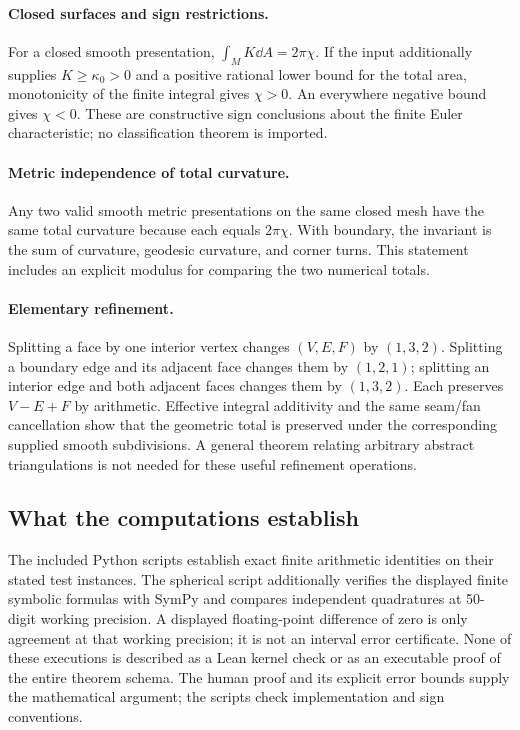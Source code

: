 \paragraph{Closed surfaces and sign restrictions.}
For a closed smooth presentation, $\int_MK\dd A=2\pi\chi$. If the input additionally supplies $K\ge\kappa_0>0$ and a positive rational lower bound for the total area, monotonicity of the finite integral gives $\chi>0$. An everywhere negative bound gives $\chi<0$. These are constructive sign conclusions about the finite Euler characteristic; no classification theorem is imported.

\paragraph{Metric independence of total curvature.}
Any two valid smooth metric presentations on the same closed mesh have the same total curvature because each equals $2\pi\chi$. With boundary, the invariant is the sum of curvature, geodesic curvature, and corner turns. This statement includes an explicit modulus for comparing the two numerical totals.

\paragraph{Elementary refinement.}
Splitting a face by one interior vertex changes $(V,E,F)$ by $(1,3,2)$. Splitting a boundary edge and its adjacent face changes them by $(1,2,1)$; splitting an interior edge and both adjacent faces changes them by $(1,3,2)$. Each preserves $V-E+F$ by arithmetic. Effective integral additivity and the same seam/fan cancellation show that the geometric total is preserved under the corresponding supplied smooth subdivisions. A general theorem relating arbitrary abstract triangulations is not needed for these useful refinement operations.

\subsection{What the computations establish}

The included Python scripts establish exact finite arithmetic identities on their stated test instances. The spherical script additionally verifies the displayed finite symbolic formulas with SymPy and compares independent quadratures at 50-digit working precision. A displayed floating-point difference of zero is only agreement at that working precision; it is not an interval error certificate. None of these executions is described as a Lean kernel check or as an executable proof of the entire theorem schema. The human proof and its explicit error bounds supply the mathematical argument; the scripts check implementation and sign conventions.
